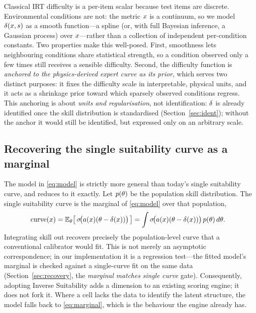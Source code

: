 Classical IRT difficulty is a per-item scalar because test items are discrete.
Environmental conditions are not: the metric $x$ is a continuum, so we model
$\delta(x,s)$ as a smooth function---a spline (or, with full Bayesian
inference, a Gaussian process) over $x$---rather than a collection of
independent per-condition constants. Two properties make this well-posed. First,
smoothness lets neighbouring conditions share statistical strength, so a condition
observed only a few times still receives a sensible difficulty. Second, the
difficulty function is \emph{anchored to the physics-derived expert curve as its
prior}, which serves two distinct purposes: it fixes the difficulty scale in
interpretable, physical units, and it acts as a shrinkage prior toward which
sparsely observed conditions regress. This anchoring is about \emph{units and
regularisation}, not identification: $\delta$ is already identified once the skill
distribution is standardised (Section~\ref{sec:ident}); without the anchor it
would still be identified, but expressed only on an arbitrary scale.

\subsection{Recovering the single suitability curve as a marginal}
\label{sec:marginal}

The model in \eqref{eq:model} is strictly more general than today's single
suitability curve, and reduces to it exactly. Let $p(\theta)$ be the population
skill distribution. The single suitability curve is the marginal of
\eqref{eq:model} over that population,
\begin{equation}
  \label{eq:marginal}
  \mathrm{curve}(x)
    = \mathbb{E}_{\theta}\!\left[\, \sigma\!\big(a(x)(\theta - \delta(x))\big)\,\right]
    = \int \sigma\!\big(a(x)(\theta - \delta(x))\big)\, p(\theta)\, d\theta .
\end{equation}
Integrating skill out recovers precisely the population-level curve that a
conventional calibrator would fit. This is not merely an asymptotic
correspondence; in our implementation it is a regression test---the fitted
model's marginal is checked against a single-curve fit on the same data
(Section~\ref{sec:recovery}, the \emph{marginal matches single curve} gate).
Consequently, adopting Inverse Suitability adds a dimension to an existing
scoring engine; it does not fork it. Where a cell lacks the data to identify the
latent structure, the model falls back to \eqref{eq:marginal}, which is the
behaviour the engine already has.

